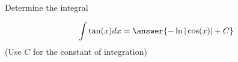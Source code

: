 \documentclass{ximera}
\author{Jason Miller}
\begin{document}
\begin{exercise}
Determine the integral

\[
\int \tan(x) dx= \answer{ -\ln| \cos(x) | +C}
\]
(Use $C$ for the constant of integration)

\end{exercise}
\end{document}
